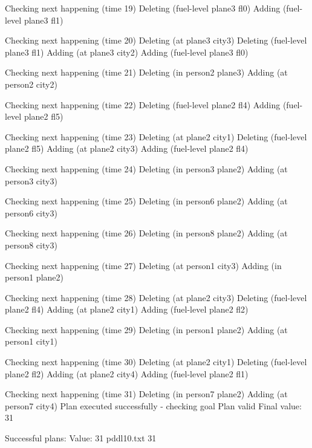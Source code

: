 Checking next happening (time 19)
Deleting (fuel-level plane3 fl0)
Adding (fuel-level plane3 fl1)

Checking next happening (time 20)
Deleting (at plane3 city3)
Deleting (fuel-level plane3 fl1)
Adding (at plane3 city2)
Adding (fuel-level plane3 fl0)

Checking next happening (time 21)
Deleting (in person2 plane3)
Adding (at person2 city2)

Checking next happening (time 22)
Deleting (fuel-level plane2 fl4)
Adding (fuel-level plane2 fl5)

Checking next happening (time 23)
Deleting (at plane2 city1)
Deleting (fuel-level plane2 fl5)
Adding (at plane2 city3)
Adding (fuel-level plane2 fl4)

Checking next happening (time 24)
Deleting (in person3 plane2)
Adding (at person3 city3)

Checking next happening (time 25)
Deleting (in person6 plane2)
Adding (at person6 city3)

Checking next happening (time 26)
Deleting (in person8 plane2)
Adding (at person8 city3)

Checking next happening (time 27)
Deleting (at person1 city3)
Adding (in person1 plane2)

Checking next happening (time 28)
Deleting (at plane2 city3)
Deleting (fuel-level plane2 fl4)
Adding (at plane2 city1)
Adding (fuel-level plane2 fl2)

Checking next happening (time 29)
Deleting (in person1 plane2)
Adding (at person1 city1)

Checking next happening (time 30)
Deleting (at plane2 city1)
Deleting (fuel-level plane2 fl2)
Adding (at plane2 city4)
Adding (fuel-level plane2 fl1)

Checking next happening (time 31)
Deleting (in person7 plane2)
Adding (at person7 city4)
Plan executed successfully - checking goal
Plan valid
Final value: 31 

Successful plans:
Value: 31
 pddl10.txt 31 
